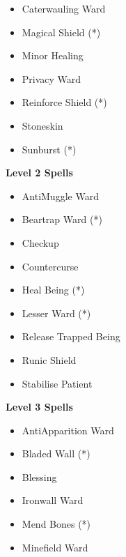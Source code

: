\begin{multicols}{4}
{\begin{itemize}[itemsep=0em]
\item Caterwauling Ward

\item Magical Shield (*) 

\item Minor Healing

\item Privacy Ward

\item Reinforce Shield (*) 

\item Stoneskin

\item Sunburst (*) 


\end{itemize}
\textbf{Level 2 Spells}
\begin{itemize}[itemsep=0em]
\renewcommand\labelitemi{-}
\item Anti\minus{}Muggle Ward

\item Beartrap Ward (*) 

\item Checkup

\item Countercurse

\item Heal Being (*) 

\item Lesser Ward (*) 

\item Release Trapped Being

\item Runic Shield

\item Stabilise Patient


\end{itemize}
\textbf{Level 3 Spells}
\begin{itemize}[itemsep=0em]
\renewcommand\labelitemi{-}
\item Anti\minus{}Apparition Ward

\item Bladed Wall (*) 

\item Blessing

\item Ironwall Ward

\item Mend Bones (*) 

\item Minefield Ward


\end{itemize}}
\end{multicols}
